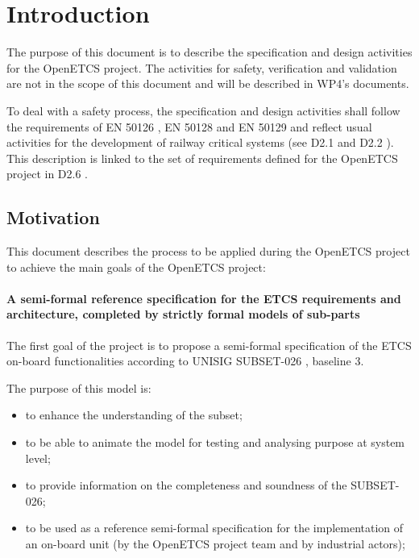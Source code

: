 \section{Introduction}

The purpose of this document is to describe the specification and design activities for the OpenETCS project. The activities for safety, verification and validation are not in the scope of this document and will be described in WP4's documents.

To deal with a safety process, the specification and design activities shall follow the requirements of EN 50126 \citep{EN_50126}, EN 50128 \citep{EN_50128} and EN 50129 \citep{EN_50129} and reflect usual activities for the development of railway critical systems (see D2.1 \citep{D2_1}  and D2.2 \citep{D2_2}).
This description is linked to the set of requirements defined for the OpenETCS project in D2.6 \citep{D2_6}.

\subsection{Motivation}

This document describes the process to  be applied  during the OpenETCS project to achieve the main goals of the OpenETCS project:

\paragraph{A semi-formal reference specification for the ETCS requirements and architecture, completed by strictly formal  models of sub-parts}
The first goal of the project is to propose a semi-formal specification of the ETCS on-board functionalities according to  UNISIG SUBSET-026 \cite{unisig_subset-026_2012}, baseline 3.

The purpose of this model is:
\begin{itemize}
\item to enhance the understanding of the subset;
\item to be able to animate the model for testing and analysing purpose at system level;
\item to provide information on the completeness and soundness of the SUBSET-026;
\item to be used as a reference semi-formal specification for the implementation of an on-board unit
(by the OpenETCS project team and by industrial actors);
\end{itemize}

